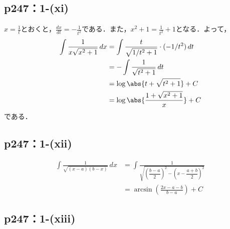 \documentclass[a4paper,10pt,fleqn]{ltjsarticle}
\begin{document}
\subsection*{p247：1-(xi)}


\begin{tleftbar}
    $x=\frac{1}{t}$とおくと，$\frac{dx}{dt}=-\frac{1}{t^2}$である．また，$x^2+1 = \frac{1}{t^2} +1$となる．よって，
    \begin{align*}
        \int \frac{1}{x\sqrt{x^2+1}} \, dx & = \int \frac{t}{\sqrt{1/t^2+1}} \cdot (-1/t^2) \, dt \\
                                           & = -\int \frac{1}{\sqrt{t^2+1}} \, dt                 \\
                                           & = \log \abs{t+\sqrt{t^2+1}}+ C                       \\
                                           & = \log \abs{\frac{1+\sqrt{x^2+1}}{x}}+C
    \end{align*}
    である．
\end{tleftbar}


\subsection*{p247：1-(xii)}


\begin{tleftbar}
    \begin{align*}
        \int \frac{1}{\sqrt{(x-a)(b-x)}} \, dx & = \int \frac{1}{\sqrt{\left (\dfrac{b-a}{2} \right )^2 - \left (x-\dfrac{a+b}{2} \right )^2 }} \\
                                               & = \arcsin \left(\frac{2x-a-b}{b-a} \right)+C
    \end{align*}
\end{tleftbar}

\subsection*{p247：1-(xiii)}
\end{document}
